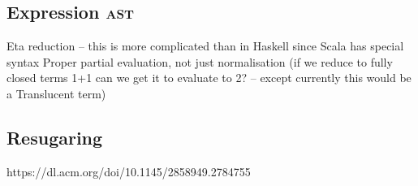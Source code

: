 \documentclass[../../main.tex]{subfiles}
\begin{document}
\subsection{Expression \textsc{ast}}
Eta reduction -- this is more complicated than in Haskell since Scala has special syntax %
Proper partial evaluation, not just normalisation (if we reduce to fully closed terms 1+1 can we get it to evaluate to 2? -- except currently this would be a Translucent term)

\subsection{Resugaring}
https://dl.acm.org/doi/10.1145/2858949.2784755
\end{document}
